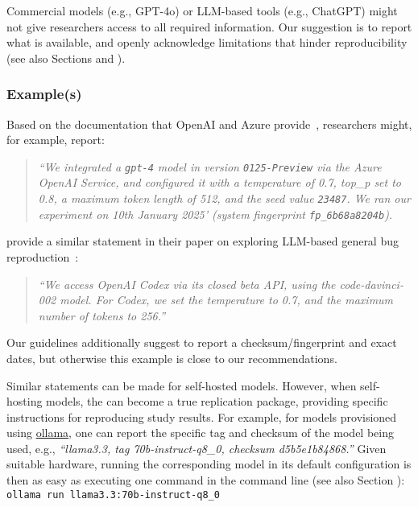 Commercial models (e.g., GPT-4o) or LLM-based tools (e.g., ChatGPT) might not give researchers access to all required information.
Our suggestion is to report what is available, and openly acknowledge limitations that hinder reproducibility (see also Sections \prompts and \limitationsmitigations).

\subsubsection{Example(s)}

Based on the documentation that OpenAI and Azure provide~\cite{OpenAI25, Azure25}, researchers might, for example, report:

\begin{quote}
\small
\it
 ``We integrated a  \texttt{gpt-4} model in version \texttt{0125-Preview} via the Azure OpenAI Service, and configured it with a temperature of 0.7, top\_p set to 0.8, a maximum token length of 512, and the  seed value \texttt{23487}.
 We ran our experiment on 10th January 2025' (system fingerprint \texttt{fp\_6b68a8204b}).
\end{quote}

\citeauthor{DBLP:conf/icse/KangYY23} provide a similar statement in their paper on exploring LLM-based general bug reproduction~\cite{DBLP:conf/icse/KangYY23}:

\begin{quote}
\small
\it
``We access OpenAI Codex via its closed beta API, using the code-davinci-002 model. For Codex, we set the temperature to 0.7, and the maximum number of tokens to 256.''
\end{quote}

Our guidelines additionally suggest to report a checksum/fingerprint and exact dates, but otherwise this example is close to our recommendations. 

Similar statements can be made for self-hosted models.
However, when self-hosting models, the \supplementarymaterial can become a true replication package, providing specific instructions for reproducing study results.
For example, for models provisioned using \href{https://ollama.com/library/}{ollama}, one can report the specific tag and checksum of the model being used, e.g., \emph{``llama3.3, tag 70b-instruct-q8\_0, checksum d5b5e1b84868.''}
Given suitable hardware, running the corresponding model in its default configuration is then as easy as executing one command in the command line (see also Section \openllm):
\texttt{ollama run llama3.3:70b-instruct-q8\_0}

